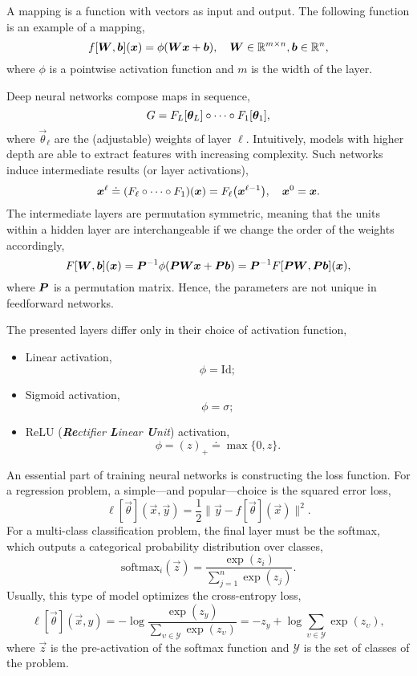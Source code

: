 A mapping is a function with vectors as input and output. The following function is an example of a
mapping, \[
    f[\bm{W}, \bm{b}](\bm{x}) = \phi(\bm{W} \bm{x} + \bm{b}), \quad \bm{W} \in \mathbb{R}^{m \times n}, \bm{b} \in \mathbb{R}^n,
\]
where $\phi$ is a pointwise activation function and $m$ is the width of the layer.

Deep neural networks compose maps in sequence, \[
    G = F_L\lft[ \vec{\theta}_L \rgt] \circ \cdots \circ F_1 \lft[ \vec{\theta}_1 \rgt],
\]
where $\vec{\theta}_{\ell}$ are the (adjustable) weights of layer $\ell$. Intuitively, models with
higher depth are able to extract features with increasing complexity. Such networks induce
intermediate results (or layer activations), \[
    \vec{x}^{\ell} \doteq \lft( F_{\ell} \circ \cdots \circ F_{1} \rgt)(\vec{x}) = F_{\ell}\lft( \vec{x}^{\ell-1} \rgt), \quad \vec{x}^0 = \vec{x}.
\]
The intermediate layers are permutation symmetric, meaning that the units within a hidden layer are
interchangeable if we change the order of the weights accordingly, \[
    F[\bm{W}, \bm{b}](\bm{x}) = \bm{P}^{-1} \phi(\bm{P}\bm{W}\bm{x} + \bm{P}\bm{b}) = \bm{P}^{-1} F[\bm{P}\bm{W},\bm{P}\bm{b}](\bm{x}),
\]
where $\bm{P}$ is a permutation matrix. Hence, the parameters are not unique in feedforward
networks.

The presented layers differ only in their choice of activation function,
\begin{itemize}
    \item Linear activation, \[
              \phi = \mathrm{Id};
          \]
    \item Sigmoid activation, \[
              \phi = \sigma;
          \]
    \item ReLU (\textit{\textbf{Re}ctifier \textbf{L}inear \textbf{U}nit}) activation, \[
              \phi = (z)_+ \doteq \max \{ 0, z \}.
          \]
\end{itemize}

An essential part of training neural networks is constructing the loss function. For a regression
problem, a simple---and popular---choice is the squared error loss, \[
    \ell[\vec{\theta}](\vec{x}, \vec{y}) = \frac{1}{2} \| \vec{y} - f[\vec{\theta}](\vec{x}) \|^2.
\]
For a multi-class classification problem, the final layer must be the softmax, which outputs a
categorical probability distribution over classes, \[
    \mathrm{softmax}_i(\vec{z}) = \frac{\exp(z_i)}{\sum_{j=1}^{n} \exp(z_j)}.
\]
Usually, this type of model optimizes the cross-entropy loss, \[
    \ell[\vec{\theta}](\vec{x}, y) = -\log \frac{\exp(z_y)}{\sum_{\upsilon \in \mathcal{Y}} \exp(z_\upsilon)} = -z_y + \log \sum_{\upsilon \in \mathcal{Y}} \exp(z_\upsilon),
\]
where $\vec{z}$ is the pre-activation of the softmax function and $\mathcal{Y}$ is the set of
classes of the problem.

